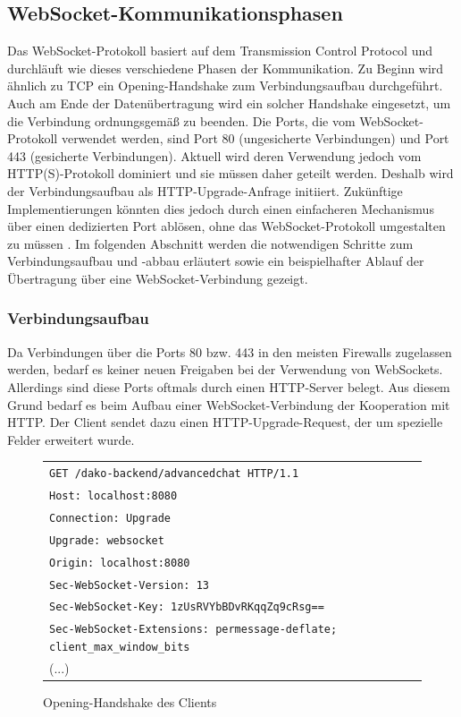 \documentclass[11pt,a4paper,titlepage]{scrartcl}
\numberwithin{equation}{section}
\begin{document}
\subsection{WebSocket-Kommunikationsphasen}\label{subsec:wsLifecycle}
Das WebSocket-Protokoll basiert auf dem Transmission Control Protocol und durchläuft wie dieses verschiedene Phasen der Kommunikation. Zu Beginn wird ähnlich zu TCP ein Opening-Handshake zum Verbindungsaufbau durchgeführt. Auch am Ende der Datenübertragung wird ein solcher Handshake eingesetzt, um die Verbindung ordnungsgemäß zu beenden. Die Ports, die vom WebSocket-Protokoll verwendet werden, sind Port 80 (ungesicherte Verbindungen) und Port 443 (gesicherte Verbindungen). Aktuell wird deren Verwendung jedoch vom HTTP(S)-Protokoll dominiert und sie müssen daher geteilt werden. Deshalb wird der Verbindungsaufbau als HTTP-Upgrade-Anfrage initiiert. Zukünftige Implementierungen könnten dies jedoch durch einen einfacheren Mechanismus über einen dedizierten Port ablösen, ohne das WebSocket-Protokoll umgestalten zu müssen \autocite[3]{fette_websocket_2011}. Im folgenden Abschnitt werden die notwendigen Schritte zum Verbindungsaufbau und -abbau erläutert sowie ein beispielhafter Ablauf der Übertragung über eine WebSocket-Verbindung gezeigt.

\subsubsection{Verbindungsaufbau}\label{subsubsec:wsOpen}
Da Verbindungen über die Ports 80 bzw. 443 in den meisten Firewalls zugelassen werden, bedarf es keiner neuen Freigaben bei der Verwendung von WebSockets. Allerdings sind diese Ports oftmals durch einen HTTP-Server belegt. Aus diesem Grund bedarf es beim Aufbau einer WebSocket-Verbindung der Kooperation mit HTTP. Der Client sendet dazu einen HTTP-Upgrade-Request, der um spezielle Felder erweitert wurde.

\begin{figure}[ht]
	\begin{center}
		\begin{tabular}{l}
		\texttt{GET /dako-backend/advancedchat HTTP/1.1} \\
		\texttt{Host: localhost:8080} \\
		\texttt{Connection: Upgrade} \\
		\texttt{Upgrade: websocket} \\
		\texttt{Origin: localhost:8080} \\
		\texttt{Sec-WebSocket-Version: 13}\\
		\texttt{Sec-WebSocket-Key: 1zUsRVYbBDvRKqqZq9cRsg==}\\
		\texttt{Sec-WebSocket-Extensions: permessage-deflate; client\_max\_window\_bits}\\
		(...)\vspace{-5mm}
		\end{tabular}
	\end{center}
	\caption{Opening-Handshake des Clients}
	\label{fig:wsOpenHandshakeClient}
\end{figure}
\end{document}
